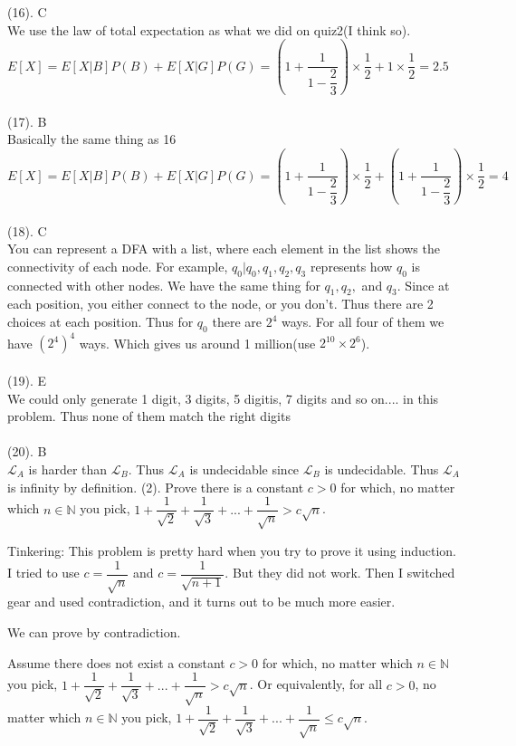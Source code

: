 \documentclass{article}
\begin{document}
	(16). C\\
	We use the law of total expectation as what we did on quiz2(I think so). $E[X] = E[X|B]P(B)+E[X|G]P(G) = \left(1+\dfrac{1}{1-\dfrac{2}{3}}\right) \times \dfrac{1}{2} + 1 \times \dfrac{1}{2} = 2.5$\\\\
	(17). B\\
	Basically the same thing as 16\\
	$E[X] = E[X|B]P(B)+E[X|G]P(G) = \left(1+\dfrac{1}{1-\dfrac{2}{3}}\right) \times \dfrac{1}{2} + \left(1+\dfrac{1}{1-\dfrac{2}{3}}\right) \times \dfrac{1}{2} = 4$\\\\
	(18). C\\
	You can represent a DFA with a list, where each element in the list shows the connectivity of each node. For example, $q_0|q_0,q_1,q_2,q_3$ represents how $q_0$ is connected with other nodes. We have the same thing for $q_1,q_2,$ and $q_3$. Since at each position, you either connect to the node, or you don't. Thus there are 2 choices at each position. Thus for $q_0$ there are $2^4$ ways. For all four of them we have $(2^4)^4$ ways. Which gives us around 1 million(use $2^10 \times 2^6$). \\\\
	(19). E\\
	We could only generate 1 digit, 3 digits, 5 digitis, 7 digits and so on.... in this problem. Thus none of them match the right digits\\\\
	(20). B\\
	$\mathcal{L}_A$ is harder than $\mathcal{L}_B$. Thus $\mathcal{L}_A$ is undecidable since $\mathcal{L}_B$ is undecidable. Thus $\mathcal{L}_A$ is infinity by definition. 
	\newpage
	\noindent (2). 
	Prove there is a constant $c>0$ for which, no matter which $n \in \mathbb{N}$ you pick, $1+\dfrac{1}{\sqrt{2}} + \dfrac{1}{\sqrt{3}}+...+\dfrac{1}{\sqrt{n}}>c\sqrt{n}$.
	
	Tinkering: This problem is pretty hard when you try to prove it using induction. I tried to use $c = \dfrac{1}{\sqrt{n}}$ and $c = \dfrac{1}{\sqrt{n+1}}$. But they did not work. Then I switched gear and used contradiction, and it turns out to be much more easier. 


	\text{\bf \textcolor{red}{Prove:}}We can prove by contradiction.
	
	Assume there does not exist a constant $c>0$ for which, no matter which $n \in \mathbb{N}$ you pick, $1+\dfrac{1}{\sqrt{2}} + \dfrac{1}{\sqrt{3}}+...+\dfrac{1}{\sqrt{n}}>c\sqrt{n}$. Or equivalently, for all $c>0$, no matter which $n \in \mathbb{N}$ you pick, $1+\dfrac{1}{\sqrt{2}} + \dfrac{1}{\sqrt{3}}+...+\dfrac{1}{\sqrt{n}} \leq c\sqrt{n}$.
	
\end{document}
